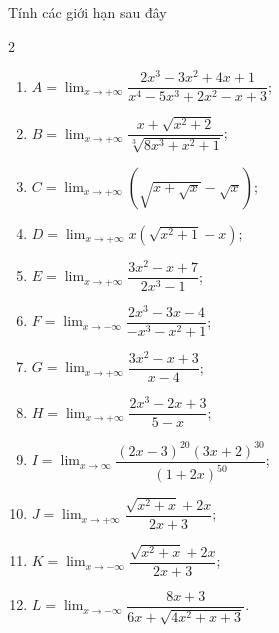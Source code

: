 \begin{ex}%

	Tính các giới hạn  sau đây
	\begin{multicols}{2}
		\begin{enumerate}
			\item $A=\displaystyle\lim_{x \to +\infty} \dfrac{2x^3-3x^2+4x+1}{x^4-5x^3+2x^2-x+3}$; 
			\item $B=\displaystyle\lim_{x \to  +\infty} \dfrac{x+\sqrt{x^2+2}}{\sqrt[3]{8x^3+x^2+1}}$;
			\item $C=\displaystyle\lim_{x\to  +\infty}\left( \sqrt{x+\sqrt{x}}-\sqrt{x}\right)$;
			 \item $D=\displaystyle\lim_{x\to +\infty} x \left(\sqrt{x^2+1}-x \right)$;
			\item  $E=\displaystyle\lim_{x\to +\infty} \dfrac{3x^2-x+7}{2x^3-1}$;
			\item $F=\displaystyle\lim_{x\to -\infty} \dfrac{2x^3-3x-4}{-x^3-x^2+1}$; 
			\item  $G=\displaystyle\lim_{x\to +\infty} \dfrac{3x^2-x+3}{x-4}$;
			\item $H=\displaystyle\lim_{x\to +\infty}  \dfrac{2x^3-2x+3}{5-x}$;
			 \item $I=\displaystyle\lim_{x\to \infty} \dfrac{(2x-3)^{20}(3x+2)^{30}}{(1+2x)^{50}}$;
			\item $J=\displaystyle\lim_{x\to +\infty}  \dfrac{\sqrt{x^2+x}+2x}{2x+3}$;
			\item $K=\displaystyle\lim_{x\to  -\infty} \dfrac{\sqrt{x^2+x}+2x}{2x+3}$;
			\item $L=\displaystyle\lim_{x\to  -\infty} \dfrac{8x+3}{6x+\sqrt{4x^2+x+3}}$.
		\end{enumerate}
	\end{multicols}
\end{ex}

